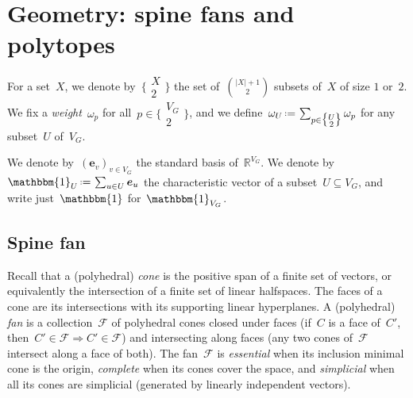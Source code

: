 \documentclass{amsart}
\theoremstyle{definition}
\newcommand{\R}{\mathbb{R}} %
\renewcommand{\c}[1]{{\mathcal{#1}}} %
\renewcommand{\b}[1]{{\boldsymbol{#1}}} %
\newcommand{\bigset}[2]{\big\{ #1 \;\big|\; #2 \big\}} %
\newcommand{\dotprod}[2]{\langle \, #1 \; | \; #2 \, \rangle} %
\newcommand{\one}{\mathbbm{1}} %
\newcommand{\eqdef}{\mbox{\,\raisebox{0.2ex}{\scriptsize\ensuremath{\mathrm:}}\ensuremath{=}\,}} %
\newcommand{\eg}{\textit{e.g.}~} %
\newcommand{\darkblue}{\color{darkblue}} %
\newcommand{\defn}[1]{\textsl{\darkblue #1}} %
\newcommand{\weight}{\omega} %
\newcommand{\monombinom}[1]{\big\{\!\begin{smallmatrix} #1 \\ 2 \end{smallmatrix}\!\big\}}
\begin{document}
\section{Geometry: spine fans and polytopes}

For a set~$X$, we denote by~$\monombinom{X}$ the set of~$\binom{|X|+1}{2}$ subsets of~$X$ of size $1$ or~$2$.
We fix a \defn{weight}~$\weight_p$ for all~$p \in \monombinom{V_G}$, and we define~$\weight_U \eqdef \sum_{p \in \monombinom{U}} \weight_p$ for any subset~$U$ of~$V_G$.

We denote by~$(\b{e}_v)_{v \in V_G}$ the standard basis of~$\R^{V_G}$.
We denote by~$\one_U \eqdef \sum_{u \in U} \b{e}_u$ the characteristic vector of a subset~$U \subseteq V_G$, and write just~$\one$ for~$\one_{V_G}$.


\subsection{Spine fan}

%
Recall that a (polyhedral) \defn{cone} is the positive span of a finite set of vectors, or equivalently the intersection of a finite set of linear halfspaces.
The faces of a cone are its intersections with its supporting linear hyperplanes.
A (polyhedral) \defn{fan} is a collection~$\c{F}$ of polyhedral cones closed under faces (if~$C$ is a face of~$C'$, then~$C' \in \c{F} \Rightarrow C' \in \c{F}$) and intersecting along faces (any two cones of~$\c{F}$ intersect along a face of both).
The fan~$\c{F}$ is \defn{essential} when its inclusion minimal cone is the origin, \defn{complete} when its cones cover the space, and \defn{simplicial} when all its cones are simplicial (generated by linearly independent vectors).
\end{document}
